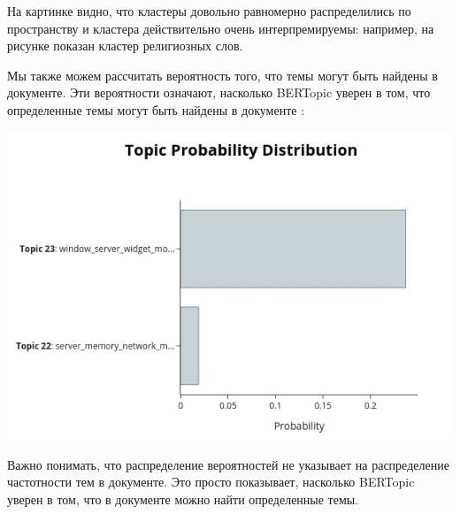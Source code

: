На картинке видно, что кластеры довольно равномерно распределились по пространству и кластера действительно очень интерпремируемы: например, на рисунке показан кластер религиозных слов.


Мы также можем рассчитать вероятность того, что темы могут быть найдены в документе. Эти вероятности означают, насколько BERTopic уверен в том, что определенные темы могут быть найдены в документе \cite{bib_4}:

\begin{center}
\includegraphics[scale=0.9]{pics/bertopic-visual-2.jpg}
\end{center}

Важно понимать, что распределение вероятностей не указывает на распределение частотности тем в документе. Это просто показывает, насколько BERTopic уверен в том, что в документе можно найти определенные темы.
